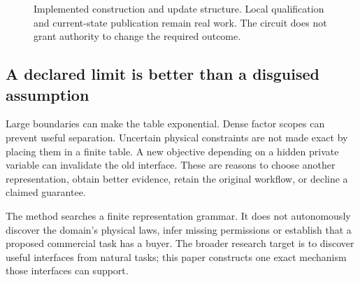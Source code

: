 \documentclass[11pt,letterpaper]{article}
\theoremstyle{definition}\newtheorem{definition}[theorem]{Definition}
\theoremstyle{remark}\newtheorem{remark}[theorem]{Remark}
\begin{document}
\begin{figure}[htbp]\centering
{}
\caption{Implemented construction and update structure. Local qualification and current-state publication remain real work. The circuit does not grant authority to change the required outcome.}
\label{fig:circuit}
\end{figure}

\subsection{A declared limit is better than a disguised assumption}
Large boundaries can make the table exponential. Dense factor scopes can prevent useful separation. Uncertain physical constraints are not made exact by placing them in a finite table. A new objective depending on a hidden private variable can invalidate the old interface. These are reasons to choose another representation, obtain better evidence, retain the original workflow, or decline a claimed guarantee.

The method searches a finite representation grammar. It does not autonomously discover the domain's physical laws, infer missing permissions or establish that a proposed commercial task has a buyer. The broader research target is to discover useful interfaces from natural tasks; this paper constructs one exact mechanism those interfaces can support.
\end{document}
